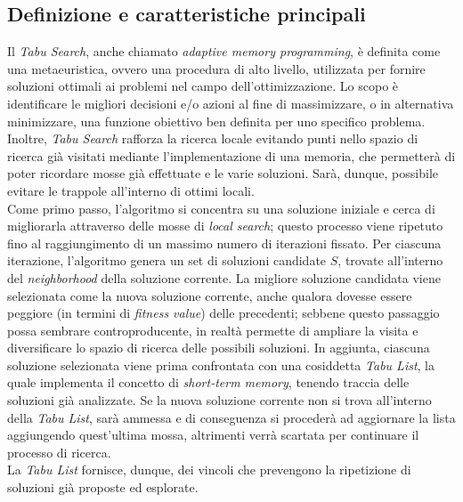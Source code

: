 \documentclass[a4paper, 10pt]{article}
\begin{document}
\subsection{Definizione e caratteristiche principali}
Il \textit{Tabu Search}, anche chiamato \textit{adaptive memory programming}, è definita come una metaeuristica, ovvero una procedura di alto livello, utilizzata per fornire soluzioni ottimali ai problemi nel campo dell'ottimizzazione. Lo scopo è identificare le migliori decisioni e/o azioni al fine di massimizzare, o in alternativa minimizzare, una funzione obiettivo ben definita per uno specifico problema. Inoltre, \textit{Tabu Search} rafforza la ricerca locale evitando punti nello spazio di ricerca già visitati mediante l'implementazione di una memoria, che permetterà di poter ricordare mosse già effettuate e le varie soluzioni. Sarà, dunque, possibile evitare le trappole all'interno di ottimi locali. \\
Come primo passo, l'algoritmo si concentra su una soluzione iniziale e cerca di migliorarla attraverso delle mosse di \textit{local search}; questo processo viene ripetuto fino al raggiungimento di un massimo numero di iterazioni fissato. Per ciascuna iterazione, l'algoritmo genera un set di soluzioni candidate $S$, trovate all'interno del \textit{neighborhood} della soluzione corrente. La migliore soluzione candidata viene selezionata come la nuova soluzione corrente, anche qualora dovesse essere peggiore (in termini di \textit{fitness value}) delle precedenti; sebbene questo passaggio possa sembrare controproducente, in realtà permette di ampliare la visita e diversificare lo spazio di ricerca delle possibili soluzioni. In aggiunta, ciascuna soluzione selezionata viene prima confrontata con una cosiddetta \textit{Tabu List}, la quale implementa il concetto di \textit{short-term memory}, tenendo traccia delle soluzioni già analizzate. Se la nuova soluzione corrente non si trova all'interno della \textit{Tabu List}, sarà ammessa e di conseguenza si procederà ad aggiornare la lista aggiungendo quest'ultima mossa, altrimenti verrà scartata per continuare il processo di ricerca. \\
La \textit{Tabu List} fornisce, dunque, dei vincoli che prevengono la ripetizione di soluzioni già proposte ed esplorate. 
\end{document}
